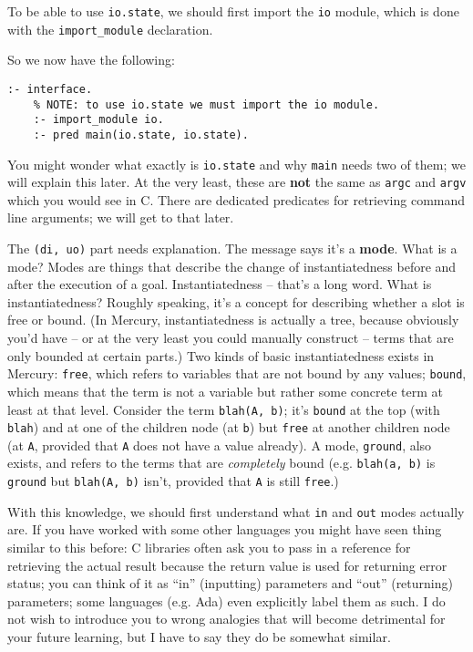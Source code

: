 To be able to use \texttt{io.state}, we should first import the \texttt{io} module, which is done with the \texttt{import\_module} declaration.

So we now have the following:

\begin{lstlisting}[language=Mercury]
	:- interface.
	% NOTE: to use io.state we must import the io module.
	:- import_module io.
	:- pred main(io.state, io.state).
\end{lstlisting}

You might wonder what exactly is \texttt{io.state} and why \texttt{main} needs two of them; we will explain this later. At the very least, these are \textbf{not} the same as \texttt{argc} and \texttt{argv} which you would see in C. There are dedicated predicates for retrieving command line arguments; we will get to that later.

The \texttt{(di, uo)} part needs explanation. The message says it's a \textbf{mode}. What is a mode? Modes are things that describe the change of instantiatedness before and after the execution of a goal. Instantiatedness -- that's a long word. What is instantiatedness? Roughly speaking, it's a concept for describing whether a slot is free or bound. (In Mercury, instantiatedness is actually a tree, because obviously you'd have -- or at the very least you could manually construct -- terms that are only bounded at certain parts.) Two kinds of basic instantiatedness exists in Mercury: \texttt{free}, which refers to variables that are not bound by any values; \texttt{bound}, which means that the term is not a variable but rather some concrete term at least at that level. Consider the term \texttt{blah(A, b)}; it's \texttt{bound} at the top (with \texttt{blah}) and at one of the children node (at \texttt{b}) but \texttt{free} at another children node (at \texttt{A}, provided that \texttt{A} does not have a value already). A mode, \texttt{ground}, also exists, and refers to the terms that are \emph{completely} bound (e.g. \texttt{blah(a, b)} is \texttt{ground} but \texttt{blah(A, b)} isn't, provided that \texttt{A} is still \texttt{free}.)

With this knowledge, we should first understand what \texttt{in} and \texttt{out} modes actually are. If you have worked with some other languages you might have seen thing similar to this before: C libraries often ask you to pass in a reference for retrieving the actual result because the return value is used for returning error status; you can think of it as ``in'' (inputting) parameters and ``out'' (returning) parameters; some languages (e.g. Ada) even explicitly label them as such. I do not wish to introduce you to wrong analogies that will become detrimental for your future learning, but I have to say they do be somewhat similar.

